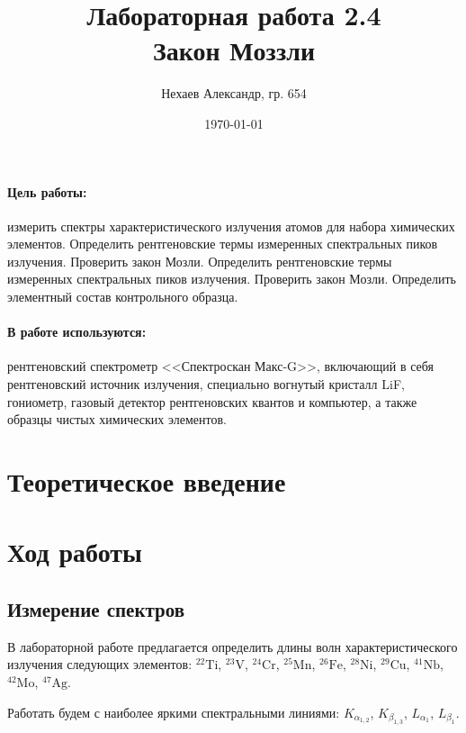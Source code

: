 \documentclass[a4paper, 12pt]{article}
\title{Лабораторная работа 2.4\\Закон Моззли}
\author{Нехаев Александр, гр. 654}
\date{\today}
\begin{document}
\maketitle
\tableofcontents
\paragraph{Цель работы:}
измерить спектры характеристического излучения атомов для набора химических элементов. Определить рентгеновские термы измеренных спектральных пиков излучения. Проверить закон Мозли. Определить рентгеновские термы измеренных спектральных пиков излучения. Проверить закон Мозли. Определить элементный состав контрольного образца.
\paragraph{В работе используются:}
рентгеновский спектрометр <<Спектроскан Макс-G>>, включающий в себя рентгеновский источник излучения, специально вогнутый кристалл LiF, гониометр, газовый детектор рентгеновских квантов и компьютер, а также образцы чистых химических элементов.
\section{Теоретическое введение}
\section{Ход работы}
\subsection{Измерение спектров}
В лабораторной работе предлагается определить длины волн характеристического излучения следующих элементов: $^{22}\text{Ti}$, $^{23}\text{V}$, $^{24}\text{Cr}$, $^{25}\text{Mn}$, $^{26}\text{Fe}$, $^{28}\text{Ni}$, $^{29}\text{Cu}$, $^{41}\text{Nb}$, $^{42}\text{Mo}$, $^{47}\text{Ag}$.\par
Работать будем с наиболее яркими спектральными линиями: $K_{\alpha_{1,2}}$, $K_{\beta_{1,3}}$, $L_{\alpha_1}$, $L_{\beta_1}$.
\end{document}
